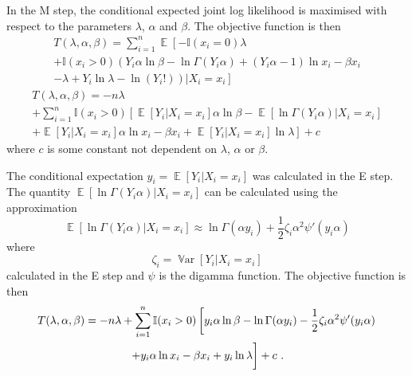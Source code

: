 \documentclass[12pt, a4paper]{memoir}
\DeclareMathOperator{\expectation}{\mathbb{E}}
\DeclareMathOperator{\variance}{\mathbb{V}ar}
\begin{document}
In the M step, the conditional expected joint log likelihood is maximised with respect to the parameters $\lambda$, $\alpha$ and $\beta$. The objective function is then
\begin{multline*}
T(\lambda,\alpha,\beta)
=
\sum_{i=1}^n
\expectation\left[
	-\mathbb{I}(x_i=0)
	\lambda
	\right.\\\left.+
	\mathbb{I}(x_i>0)
	\left(
	Y_i\alpha\ln\beta-\ln\Gamma(Y_i\alpha)+(Y_i\alpha-1)\ln x_i - \beta x_i
	\right.\right.\\\left.\left.	
	- \lambda + Y_i \ln \lambda - \ln(Y_i!)
	\right)
|X_i=x_i\right]
\end{multline*}
\begin{multline*}
T(\lambda,\alpha,\beta)
=
-n\lambda
\\+
	\sum_{i=1}^n
	\mathbb{I}(x_i>0)
	\left[
	\expectation[Y_i|X_i=x_i]\alpha\ln\beta-\expectation[\ln\Gamma(Y_i\alpha)|X_i=x_i]
	\right.\\\left.
	+\expectation[Y_i|X_i=x_i]\alpha\ln x_i - \beta x_i
	+ \expectation[Y_i|X_i=x_i] \ln \lambda
	\right] + c
\end{multline*}
where $c$ is some constant not dependent on $\lambda$, $\alpha$ or $\beta$.

The conditional expectation $y_i = \expectation[Y_i|X_i=x_i]$ was calculated in the E step. The quantity $\expectation[\ln\Gamma(Y_i\alpha)|X_i=x_i]$ can be calculated using the approximation
\begin{equation}
\expectation[\ln\Gamma(Y_i\alpha)|X_i=x_i] \approx
\ln\Gamma(\alpha y_i) + \frac{1}{2}\zeta_i\alpha^2\psi'(y_i\alpha)
\end{equation}
where
\begin{equation}
\zeta_i = \variance[Y_i|X_i=x_i]
\end{equation}
calculated in the E step and $\psi$ is the digamma function. The objective function is then
\begin{multline}
T(\lambda,\alpha,\beta)
=
-n\lambda+
	\sum_{i=1}^n
	\mathbb{I}(x_i>0)
	\left[
	y_i\alpha\ln\beta-\ln\Gamma(\alpha y_i) - \frac{1}{2}\zeta_i\alpha^2\psi'(y_i\alpha)
	\right.\\\left.
	+y_i\alpha\ln x_i - \beta x_i
	+ y_i \ln \lambda
	\vphantom{\frac{1}{1}}\right] + c \ .
\end{multline}
\end{document}
